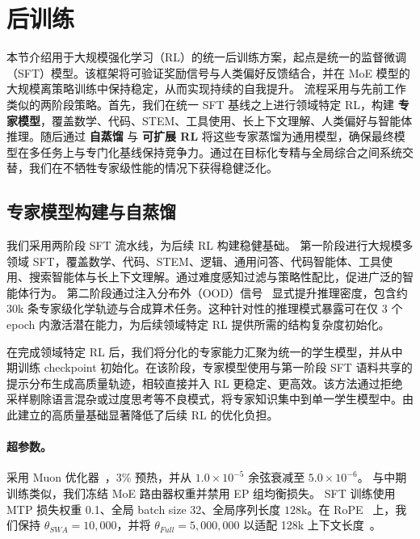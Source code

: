 \section{后训练}
\label{sec:post-train}


本节介绍用于大规模强化学习（RL）的统一后训练方案，起点是统一的监督微调（SFT）模型。该框架将可验证奖励信号与人类偏好反馈结合，并在 MoE 模型的大规模离策略训练中保持稳定，从而实现持续的自我提升。
流程采用与先前工作~\cite{liu2025deepseek, zeng2025glm} 类似的两阶段策略。首先，我们在统一 SFT 基线之上进行领域特定 RL，构建 \textbf{专家模型}，覆盖数学、代码、STEM、工具使用、长上下文理解、人类偏好与智能体推理。随后通过 \textbf{自蒸馏} 与 \textbf{可扩展 RL} 将这些专家蒸馏为通用模型，确保最终模型在多任务上与专门化基线保持竞争力。通过在目标化专精与全局综合之间系统交替，我们在不牺牲专家级性能的情况下获得稳健泛化。


\subsection{专家模型构建与自蒸馏}
\label{sec:sft}

我们采用两阶段 SFT 流水线，为后续 RL 构建稳健基础。
第一阶段进行大规模多领域 SFT，覆盖数学、代码、STEM、逻辑、通用问答、代码智能体、工具使用、搜索智能体与长上下文理解。通过难度感知过滤与策略性配比，促进广泛的智能体行为。
第二阶段通过注入分布外（OOD）信号~\cite{ye2025limoreasoning, muennighoff2025s1} 显式提升推理密度，包含约 30k 条专家级化学轨迹与合成算术任务。这种针对性的推理模式暴露可在仅 3 个 epoch 内激活潜在能力，为后续领域特定 RL 提供所需的结构复杂度初始化。


在完成领域特定 RL 后，我们将分化的专家能力汇聚为统一的学生模型，并从中期训练 checkpoint 初始化。在该阶段，专家模型使用与第一阶段 SFT 语料共享的提示分布生成高质量轨迹，相较直接并入 RL 更稳定、更高效。该方法通过拒绝采样剔除语言混杂或过度思考等不良模式，将专家知识集中到单一学生模型中。由此建立的高质量基础显著降低了后续 RL 的优化负担。

\paragraph{超参数。}
采用 Muon 优化器~\cite{jordan2024muon}，3\% 预热，并从 $1.0 \times 10^{-5}$ 余弦衰减至 $5.0 \times 10^{-6}$。
与中期训练类似，我们冻结 MoE 路由器权重并禁用 EP 组均衡损失。
SFT 训练使用 MTP 损失权重 0.1、全局 batch size 32、全局序列长度 $128\text{k}$。在 RoPE~\cite{su2024roformer} 上，我们保持 $\theta_{SWA}=10,000$，并将 $\theta_{Full}=5,000,000$ 以适配 128k 上下文长度~\cite{xiong2024effective}。



